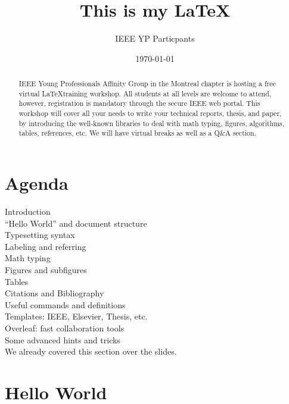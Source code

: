 \documentclass{article}
\begin{document}
	
	\graphicspath{{figures/}}
	
	\title{This is my \LaTeX}
	
	\author{IEEE YP Particpants}
	\date{\today}
	
	\maketitle
	
	
	\newpage
	\tableofcontents 
	\newpage
	
	
	
	
	\begin{abstract}
		IEEE Young Professionals Affinity Group in the Montreal chapter is hosting a free virtual \LaTeX training workshop. All students at all levels are welcome to attend, however, registration is mandatory through the secure IEEE web portal. This workshop will cover all your needs to write your technical reports, thesis, and paper, by introducing the well-known libraries to deal with math typing, figures, algorithms, tables, references, etc. We will have virtual breaks as well as a Q\&A section. 
	\end{abstract}
	
	
	\section{Agenda}
	
	
	
	
Introduction \\
“Hello World” and document structure  \\
Typesetting syntax \\
Labeling and referring  \\
Math typing  \\
Figures and subfigures \\
Tables \\
Citations and Bibliography \\
Useful commands and definitions \\
Templates: IEEE, Elsevier, Thesis, etc.  \\
Overleaf: fast collaboration tools\\
Some advanced hints and tricks \\




We already covered this section over the slides. 

\section{Hello World}
\label{sec:hello}
\end{document}
